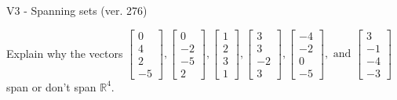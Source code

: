 \begin{exercise}
  \begin{exerciseTitle}V3 - Spanning sets (ver. 276)\end{exerciseTitle}
  \begin{exerciseStatement}
    Explain why the vectors \(\left[\begin{array}{r}
0 \\
4 \\
2 \\
-5
\end{array}\right] , \left[\begin{array}{r}
0 \\
-2 \\
-5 \\
2
\end{array}\right] , \left[\begin{array}{r}
1 \\
2 \\
3 \\
1
\end{array}\right] , \left[\begin{array}{r}
3 \\
3 \\
-2 \\
3
\end{array}\right] , \left[\begin{array}{r}
-4 \\
-2 \\
0 \\
-5
\end{array}\right] , \text{ and } \left[\begin{array}{r}
3 \\
-1 \\
-4 \\
-3
\end{array}\right]\) span or don't span \(\mathbb{R}^4\). 
	



\end{exerciseStatement}
\end{exercise}
